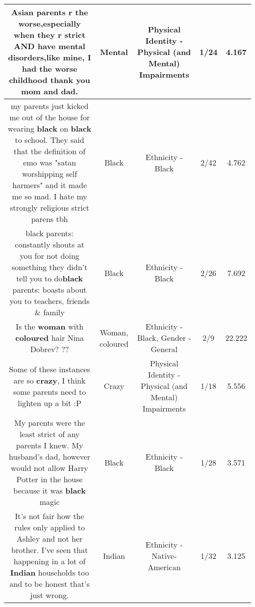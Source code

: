 \documentclass[11pt]{article}
\newlength\mylength
\begin{document}
\begin{center}
\begin{longtable}{|C{.65\mylength}|C{.30\mylength}|C{.12\mylength}|C{.12\mylength}|C{.12\mylength}|}
  \small Asian parents r the worse,especially when they r strict AND have \textbf{mental} disorders,like mine, I had the worse childhood thank you mom and dad.\normalsize   & Mental & Physical Identity - Physical (and Mental) Impairments & 1/24 & 4.167 \\  \hline
  \small my parents just kicked me out of the house for wearing \textbf{black} on \textbf{black} to school. They said that the definition of emo was "satan worshipping self harmers" and it made me so mad. I hate my strongly religious strict parens tbh\normalsize   & Black & Ethnicity - Black & 2/42 & 4.762 \\  \hline
  \small black parents: constantly shouts at you for not doing something they didn't tell you to do\textbf{black} parents: boasts about you to teachers, friends \& family\normalsize   & Black & Ethnicity - Black & 2/26 & 7.692 \\  \hline
  \small Is the \textbf{woman} with \textbf{coloured} hair Nina Dobrev? ??\normalsize   & Woman, coloured & Ethnicity - Black, Gender - General & 2/9 & 22.222 \\  \hline
  \small Some of these instances are so \textbf{crazy}, I think some parents need to lighten up a bit :P\normalsize   & Crazy & Physical Identity - Physical (and Mental) Impairments & 1/18 & 5.556 \\  \hline
  \small My parents were the least strict of any parents I knew. My husband's dad, however would not allow Harry Potter in the house because it was \textbf{black} magic\normalsize   & Black & Ethnicity - Black & 1/28 & 3.571 \\  \hline
  \small It's not fair how the rules only applied to Ashley and not her brother. I've seen that happening in a lot of \textbf{Indian} households too and to be honest that's just wrong.\normalsize   & Indian & Ethnicity - Native-American & 1/32 & 3.125 \\  \hline

\end{longtable}
\end{center}
\end{document}
